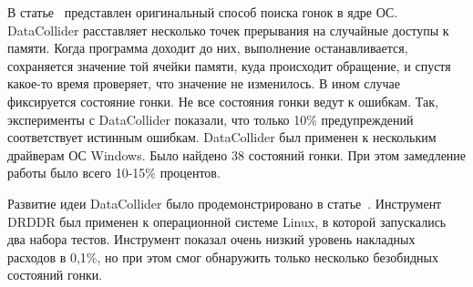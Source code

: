 В статье~\cite{DataCollider} представлен оригинальный способ поиска гонок в ядре ОС.
DataCollider расставляет несколько точек прерывания на случайные доступы к памяти.
Когда программа доходит до них, выполнение останавливается, сохраняется значение той ячейки памяти, куда происходит обращение, и спустя какое-то время проверяет, что значение не изменилось.
В ином случае фиксируется состояние гонки.
Не все состояния гонки ведут к ошибкам. Так, эксперименты с DataCollider показали, что только 10\% предупреждений соответствует истинным ошибкам. 
DataCollider был применен к нескольким драйверам ОС Windows. Было найдено 38 состояний гонки. При этом замедление работы было всего 10-15\% процентов. 

Развитие идеи DataCollider было продемонстрировано в статье~\cite{DRDDR}.
Инструмент DRDDR был применен к операционной системе Linux, в которой запускались два набора тестов. 
Инструмент показал очень низкий уровень накладных расходов в 0,1\%, но при этом смог обнаружить только несколько безобидных состояний гонки.

